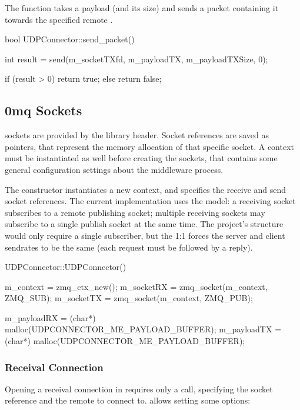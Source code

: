 The  function takes a \gls{payload} (and its size) and sends a \gls{packet} containing it towards the specified remote .

\begin{codelist}{1}
bool UDPConnector::send_packet() {
    int result = send(m_socketTXfd, m_payloadTX, m_payloadTXSize, 0);

    if (result > 0)
        return true;
    else
        return false;
}
\end{codelist}

\subsection{0mq Sockets}

 sockets are provided by the  library  header. Socket references are saved as  pointers, that represent the memory allocation of that specific socket. A context must be instantiated as well before creating the sockets, that contains some general configuration settings about the  middleware process.

The  constructor instantiates a new context, and specifies the receive and send socket references. The current implementation uses the  model: a receiving socket subscribes to a remote publishing socket; multiple receiving sockets may subscribe to a single publish socket at the same time. The project's structure would only require a single subscriber, but the 1:1   forces the server and client sendrates to be the same (each request must be followed by a reply).

\begin{codelist}{63}
UDPConnector::UDPConnector() {
    m_context  = zmq_ctx_new();
    m_socketRX = zmq_socket(m_context, ZMQ_SUB);
    m_socketTX = zmq_socket(m_context, ZMQ_PUB);

    m_payloadRX = (char*) malloc(UDPCONNECTOR_ME_PAYLOAD_BUFFER);
    m_payloadTX = (char*) malloc(UDPCONNECTOR_ME_PAYLOAD_BUFFER);
}
\end{codelist}

\subsubsection{Receival Connection}

Opening a receival connection in  requires only a  call, specifying the socket reference and the remote  to connect to.  allows setting some options:

